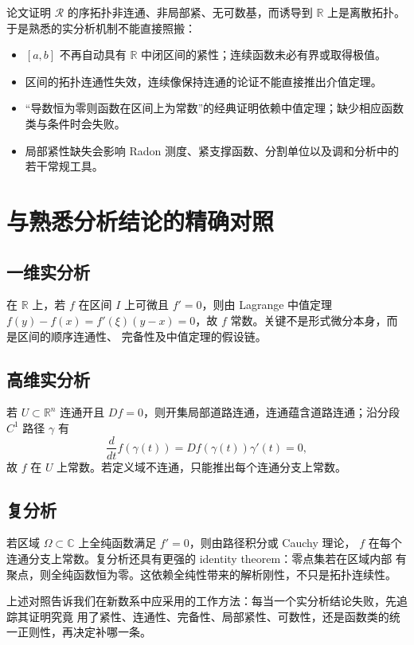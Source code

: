 \documentclass[11pt,a4paper]{article}
\theoremstyle{remark}
\newcommand{\LC}{\mathcal R}
\newcommand{\R}{\mathbb R}
\newcommand{\C}{\mathbb C}
\begin{document}
论文证明 $\LC$ 的序拓扑非连通、非局部紧、无可数基，而诱导到 $\R$ 上是离散拓扑。
于是熟悉的实分析机制不能直接照搬：

\begin{itemize}
\item $[a,b]$ 不再自动具有 $\R$ 中闭区间的紧性；连续函数未必有界或取得极值。
\item 区间的拓扑连通性失效，连续像保持连通的论证不能直接推出介值定理。
\item “导数恒为零则函数在区间上为常数”的经典证明依赖中值定理；缺少相应函数类与条件时会失败。
\item 局部紧性缺失会影响 Radon 测度、紧支撑函数、分割单位以及调和分析中的若干常规工具。
\end{itemize}

\section{与熟悉分析结论的精确对照}

\subsection{一维实分析}

在 $\R$ 上，若 $f$ 在区间 $I$ 上可微且 $f'=0$，则由 Lagrange 中值定理
$f(y)-f(x)=f'(\xi)(y-x)=0$，故 $f$ 常数。关键不是形式微分本身，而是区间的顺序连通性、
完备性及中值定理的假设链。

\subsection{高维实分析}

若 $U\subset\R^n$ 连通开且 $Df=0$，则开集局部道路连通，连通蕴含道路连通；沿分段
$C^1$ 路径 $\gamma$ 有
\[
\frac d{dt}f(\gamma(t))=Df(\gamma(t))\gamma'(t)=0,
\]
故 $f$ 在 $U$ 上常数。若定义域不连通，只能推出每个连通分支上常数。

\subsection{复分析}

若区域 $\Omega\subset\C$ 上全纯函数满足 $f'=0$，则由路径积分或 Cauchy 理论，
$f$ 在每个连通分支上常数。复分析还具有更强的 identity theorem：零点集若在区域内部
有聚点，则全纯函数恒为零。这依赖全纯性带来的解析刚性，不只是拓扑连续性。

上述对照告诉我们在新数系中应采用的工作方法：每当一个实分析结论失败，先追踪其证明究竟
用了紧性、连通性、完备性、局部紧性、可数性，还是函数类的统一正则性，再决定补哪一条。
\end{document}
